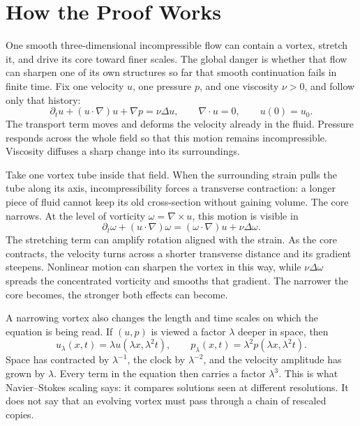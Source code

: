 \begingroup
\setlength{\parindent}{0pt}
\setlength{\parskip}{0.52\baselineskip}
\setlength{\abovedisplayskip}{8.5pt plus 2pt minus 2pt}
\setlength{\belowdisplayskip}{8.5pt plus 2pt minus 2pt}
\setlength{\jot}{6.5pt}

\section*{How the Proof Works}

One smooth three-dimensional incompressible flow can contain a vortex, stretch
it, and drive its core toward finer scales.  The global danger is whether that
flow can sharpen one of its own structures so far that smooth continuation
fails in finite time.  Fix one velocity \(u\), one pressure \(p\), and one
viscosity \(\nu>0\), and follow only that history:
\[
 \partial_tu+(u\!\cdot\nabla)u+\nabla p=\nu\Delta u,
 \qquad \nabla\!\cdot u=0,
 \qquad u(0)=u_0.
\]
The transport term moves and deforms the velocity already in the fluid.
Pressure responds across the whole field so that this motion remains
incompressible.  Viscosity diffuses a sharp change into its surroundings.

Take one vortex tube inside that field.  When the surrounding strain pulls the
tube along its axis, incompressibility forces a transverse contraction: a
longer piece of fluid cannot keep its old cross-section without gaining
volume.  The core narrows.  At the level of vorticity
\(\omega=\nabla\times u\), this motion is visible in
\[
 \partial_t\omega+(u\!\cdot\nabla)\omega
 = (\omega\!\cdot\nabla)u+\nu\Delta\omega.
\]
The stretching term can amplify rotation aligned with the strain.  As the
core contracts, the velocity turns across a shorter transverse distance and
its gradient steepens.  Nonlinear motion can sharpen the vortex in this way,
while \(\nu\Delta\omega\) spreads the concentrated vorticity and smooths that
gradient.  The narrower the core becomes, the stronger both effects can
become.

A narrowing vortex also changes the length and time scales on which the
equation is being read.  If \((u,p)\) is viewed a factor \(\lambda\) deeper in
space, then
\[
 u_\lambda(x,t)=\lambda u(\lambda x,\lambda^2t),
 \qquad
 p_\lambda(x,t)=\lambda^2p(\lambda x,\lambda^2t).
\]
Space has contracted by \(\lambda^{-1}\), the clock by \(\lambda^{-2}\), and
the velocity amplitude has grown by \(\lambda\).  Every term in the equation
then carries a factor \(\lambda^3\).  This is what Navier--Stokes scaling says:
it compares solutions seen at different resolutions.  It does not say that an
evolving vortex must pass through a chain of rescaled copies.

